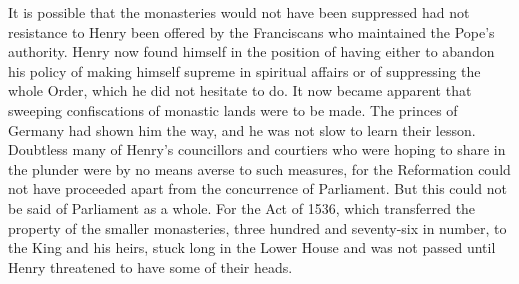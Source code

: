 \documentclass{book}
\begin{document}
It is possible that the monasteries would not have been suppressed had not resistance to Henry been offered by the Franciscans who maintained the Pope’s authority. Henry now found himself in the position of having either to abandon his policy of making himself supreme in spiritual affairs or of suppressing the whole Order, which he did not hesitate to do. It now became apparent that sweeping confiscations of monastic lands were to be made. The princes of Germany had shown him the way, and he was not slow to learn their lesson. Doubtless many of Henry’s councillors and courtiers who were hoping to share in the plunder were by no means averse to such measures, for the Reformation could not have proceeded apart from the concurrence of Parliament. But this could not be said of Parliament as a whole. For the Act of 1536, which transferred the property of the smaller monasteries, three hundred and seventy-six in number, to the King and his heirs, stuck long in the Lower House and was not passed until Henry threatened to have some of their heads.
\end{document}
